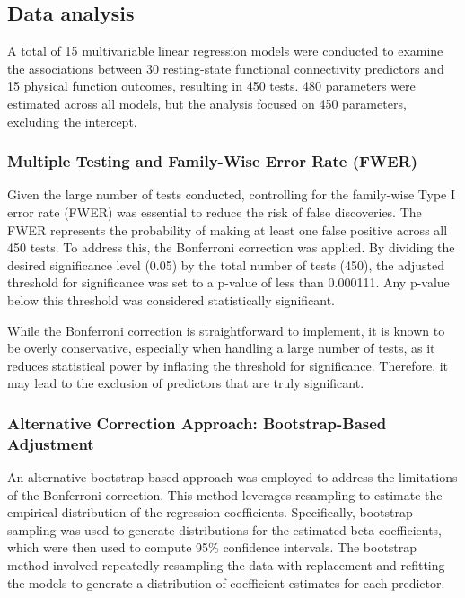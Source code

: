 \documentclass[
  12pt,
]{article}
\begin{document}
\hypertarget{data-analysis}{%
\subsection{Data analysis}\label{data-analysis}}

A total of 15 multivariable linear regression models were conducted to
examine the associations between 30 resting-state functional
connectivity predictors and 15 physical function outcomes, resulting in
450 tests. 480 parameters were estimated across all models, but the
analysis focused on 450 parameters, excluding the intercept.

\hypertarget{multiple-testing-and-family-wise-error-rate-fwer}{%
\subsubsection{Multiple Testing and Family-Wise Error Rate
(FWER)}\label{multiple-testing-and-family-wise-error-rate-fwer}}

Given the large number of tests conducted, controlling for the
family-wise Type I error rate (FWER) was essential to reduce the risk of
false discoveries. The FWER represents the probability of making at
least one false positive across all 450 tests. To address this, the
Bonferroni correction was applied. By dividing the desired significance
level (0.05) by the total number of tests (450), the adjusted threshold
for significance was set to a p-value of less than 0.000111. Any p-value
below this threshold was considered statistically significant.

While the Bonferroni correction is straightforward to implement, it is
known to be overly conservative, especially when handling a large number
of tests, as it reduces statistical power by inflating the threshold for
significance. Therefore, it may lead to the exclusion of predictors that
are truly significant.

\hypertarget{alternative-correction-approach-bootstrap-based-adjustment}{%
\subsubsection{Alternative Correction Approach: Bootstrap-Based
Adjustment}\label{alternative-correction-approach-bootstrap-based-adjustment}}

An alternative bootstrap-based approach was employed to address the
limitations of the Bonferroni correction. This method leverages
resampling to estimate the empirical distribution of the regression
coefficients. Specifically, bootstrap sampling was used to generate
distributions for the estimated beta coefficients, which were then used
to compute 95\% confidence intervals. The bootstrap method involved
repeatedly resampling the data with replacement and refitting the models
to generate a distribution of coefficient estimates for each predictor.
\end{document}
